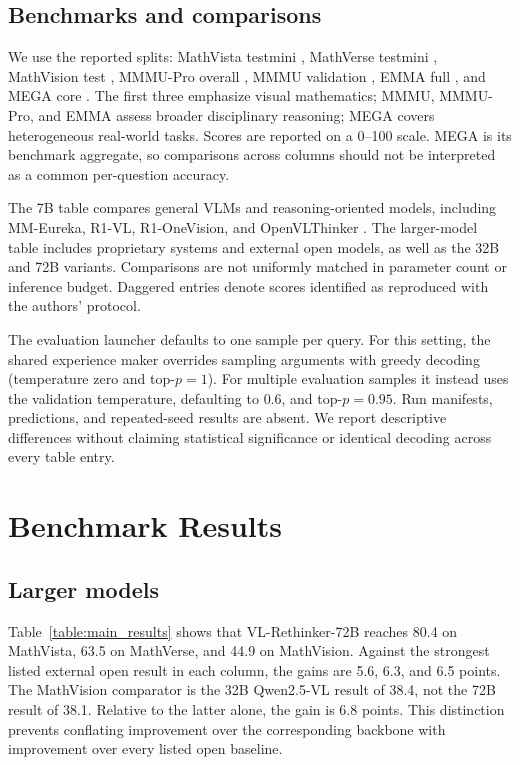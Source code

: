\documentclass[10pt,twocolumn]{article}
\newcommand{\model}{VL-Rethinker\xspace}
\begin{document}
\subsection{Benchmarks and comparisons}
We use the reported splits: MathVista testmini \citep{mathvista}, MathVerse testmini \citep{mathverse}, MathVision test \citep{mathvision}, MMMU-Pro overall \citep{mmmupro}, MMMU validation \citep{yue2024mmmu}, EMMA full \citep{emma}, and MEGA core \citep{chen2024mega}. The first three emphasize visual mathematics; MMMU, MMMU-Pro, and EMMA assess broader disciplinary reasoning; MEGA covers heterogeneous real-world tasks. Scores are reported on a 0--100 scale. MEGA is its benchmark aggregate, so comparisons across columns should not be interpreted as a common per-question accuracy.

The 7B table compares general VLMs and reasoning-oriented models, including MM-Eureka, R1-VL, R1-OneVision, and OpenVLThinker \citep{mmeureka,r1vl,R1OneVision,OpenVLThinker}. The larger-model table includes proprietary systems and external open models, as well as the 32B and 72B variants. Comparisons are not uniformly matched in parameter count or inference budget. Daggered entries denote scores identified as reproduced with the authors' protocol.

The evaluation launcher defaults to one sample per query. For this setting, the shared experience maker overrides sampling arguments with greedy decoding (temperature zero and top-$p=1$). For multiple evaluation samples it instead uses the validation temperature, defaulting to $0.6$, and top-$p=0.95$. Run manifests, predictions, and repeated-seed results are absent. We report descriptive differences without claiming statistical significance or identical decoding across every table entry.


\section{Benchmark Results}
\label{sec:results}

\subsection{Larger models}
Table~\ref{table:main_results} shows that \model-72B reaches 80.4 on MathVista, 63.5 on MathVerse, and 44.9 on MathVision. Against the strongest listed external open result in each column, the gains are 5.6, 6.3, and 6.5 points. The MathVision comparator is the 32B Qwen2.5-VL result of 38.4, not the 72B result of 38.1. Relative to the latter alone, the gain is 6.8 points. This distinction prevents conflating improvement over the corresponding backbone with improvement over every listed open baseline.
\end{document}
